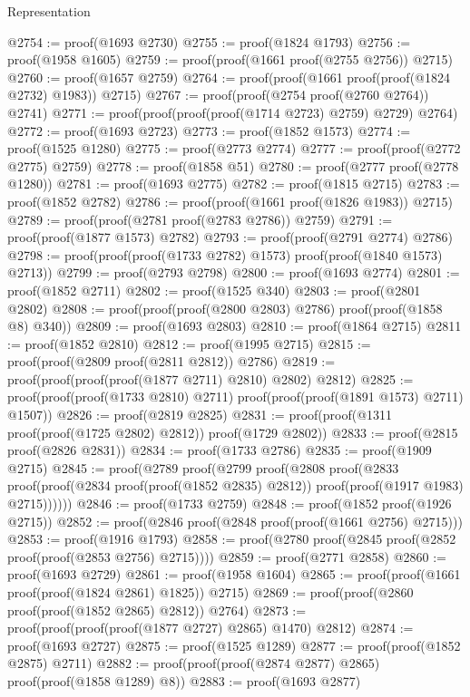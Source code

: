 \begin{lexlean}{Representation}
\begin{coremodule}
@2754 := proof(@1693 @2730)
@2755 := proof(@1824 @1793)
@2756 := proof(@1958 @1605)
@2759 := proof(proof(@1661 proof(@2755 @2756)) @2715)
@2760 := proof(@1657 @2759)
@2764 := proof(proof(@1661 proof(proof(@1824 @2732) @1983)) @2715)
@2767 := proof(proof(@2754 proof(@2760 @2764)) @2741)
@2771 := proof(proof(proof(proof(@1714 @2723) @2759) @2729) @2764)
@2772 := proof(@1693 @2723)
@2773 := proof(@1852 @1573)
@2774 := proof(@1525 @1280)
@2775 := proof(@2773 @2774)
@2777 := proof(proof(@2772 @2775) @2759)
@2778 := proof(@1858 @51)
@2780 := proof(@2777 proof(@2778 @1280))
@2781 := proof(@1693 @2775)
@2782 := proof(@1815 @2715)
@2783 := proof(@1852 @2782)
@2786 := proof(proof(@1661 proof(@1826 @1983)) @2715)
@2789 := proof(proof(@2781 proof(@2783 @2786)) @2759)
@2791 := proof(proof(@1877 @1573) @2782)
@2793 := proof(proof(@2791 @2774) @2786)
@2798 := proof(proof(proof(@1733 @2782) @1573) proof(proof(@1840 @1573) @2713))
@2799 := proof(@2793 @2798)
@2800 := proof(@1693 @2774)
@2801 := proof(@1852 @2711)
@2802 := proof(@1525 @340)
@2803 := proof(@2801 @2802)
@2808 := proof(proof(proof(@2800 @2803) @2786) proof(proof(@1858 @8) @340))
@2809 := proof(@1693 @2803)
@2810 := proof(@1864 @2715)
@2811 := proof(@1852 @2810)
@2812 := proof(@1995 @2715)
@2815 := proof(proof(@2809 proof(@2811 @2812)) @2786)
@2819 := proof(proof(proof(proof(@1877 @2711) @2810) @2802) @2812)
@2825 := proof(proof(proof(@1733 @2810) @2711) proof(proof(proof(@1891 @1573) @2711) @1507))
@2826 := proof(@2819 @2825)
@2831 := proof(proof(@1311 proof(proof(@1725 @2802) @2812)) proof(@1729 @2802))
@2833 := proof(@2815 proof(@2826 @2831))
@2834 := proof(@1733 @2786)
@2835 := proof(@1909 @2715)
@2845 := proof(@2789
      proof(@2799
          proof(@2808
              proof(@2833
                  proof(proof(@2834 proof(proof(@1852 @2835) @2812))
                      proof(proof(@1917 @1983) @2715))))))
@2846 := proof(@1733 @2759)
@2848 := proof(@1852 proof(@1926 @2715))
@2852 := proof(@2846 proof(@2848 proof(proof(@1661 @2756) @2715)))
@2853 := proof(@1916 @1793)
@2858 := proof(@2780 proof(@2845 proof(@2852 proof(proof(@2853 @2756) @2715))))
@2859 := proof(@2771 @2858)
@2860 := proof(@1693 @2729)
@2861 := proof(@1958 @1604)
@2865 := proof(proof(@1661 proof(proof(@1824 @2861) @1825)) @2715)
@2869 := proof(proof(@2860 proof(proof(@1852 @2865) @2812)) @2764)
@2873 := proof(proof(proof(proof(@1877 @2727) @2865) @1470) @2812)
@2874 := proof(@1693 @2727)
@2875 := proof(@1525 @1289)
@2877 := proof(proof(@1852 @2875) @2711)
@2882 := proof(proof(proof(@2874 @2877) @2865) proof(proof(@1858 @1289) @8))
@2883 := proof(@1693 @2877)

\end{coremodule}
\end{lexlean}
